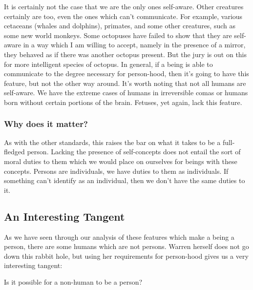 It is certainly not the case that we are the only ones self-aware. Other creatures certainly are too, even the ones which can't communicate. For example, various cetaceans (whales and dolphins), primates, and some other creatures, such as some new world monkeys.  Some octopuses have failed to show that they are self-aware in a way which I am willing to accept, namely in the presence of a mirror, they behaved as if there was another octopus present. But the jury is out on this for more intelligent species of octopus. In general, if a being is able to communicate to the degree necessary for person-hood, then it's going to have this feature, but not the other way around. It's worth noting that not all humans are self-aware. We have the extreme cases of humans in irreversible comas or humans born without certain portions of the brain. Fetuses, yet again, lack this feature. 
\subsubsection{Why does it matter?}

As with the other standards, this raises the bar on what it takes to be a full-fledged person. Lacking the presence of self-concepts does not entail the sort of moral duties to them which we would place on ourselves for beings with these concepts. Persons are individuals, we have duties to them as individuals. If something can't identify as an individual, then we don't have the same duties to it. 

\subsection{An Interesting Tangent}

As we have seen through our analysis of these features which make a being a person, there are some humans which are not persons. Warren herself does not go down this rabbit hole, but using her requirements for person-hood gives us a very interesting tangent:
\begin{center}Is it possible for a non-human to be a person?\end{center}

